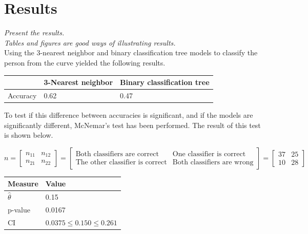 \documentclass[11pt, fleqn, titlepage]{article}
\begin{document}
\section{Results}
\textit{Present the results. \\ Tables and figures are good ways of illustrating results.} \\
Using the 3-nearest neighbor and binary classification tree models to classify the person from the curve yielded the following results.

\begin{table}[h]
	\centering
	\begin{tabular}{|l|l|l|}
		\hline
		& 3-Nearest neighbor & Binary classification tree \\ \hline
		Accuracy & 0.62               & 0.47                       \\ \hline
	\end{tabular}
\end{table}

To test if this difference between accuracies is significant, and if the models are significantly different, McNemar's test has been performed. The result of this test is shown below.

\[n = \begin{bmatrix} n_{11} & n_{12} \\ n_{21} & n_{22} \end{bmatrix} = \begin{bmatrix} \text{Both classifiers are correct} & \text{One classifier is correct} \\ \text{The other classifier is correct} & \text{Both classifiers are wrong} \end{bmatrix} = \begin{bmatrix} 37 & 25 \\ 10 & 28 \end{bmatrix}\] 

\begin{table}[H]
	\centering
	\begin{tabular}{|l|l|}
		\hline
		Measure        & Value                          \\ \hline
		$\hat{\theta}$ & 0.15                           \\ \hline
		p-value        & 0.0167                         \\ \hline
		CI             & $0.0375 \leq 0.150 \leq 0.261$ \\ \hline
	\end{tabular}
\end{table}
\end{document}
